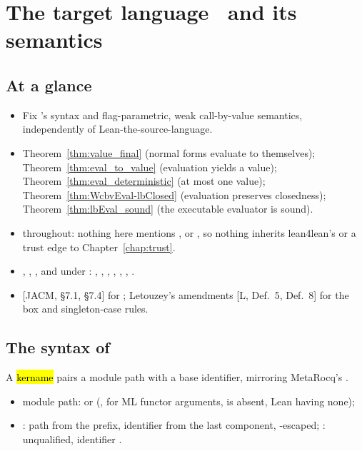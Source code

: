 \chapter{\texorpdfstring{The target language \lbox\ and its semantics}{The target language lambda-box and its semantics}}
\label{chap:lambdabox}

\section*{At a glance}
\begin{itemize}
\item {} Fix \lbox{}'s syntax and flag-parametric, weak call-by-value semantics, independently of Lean-the-source-language.
\item {} Theorem~\ref{thm:value_final} (normal forms evaluate to themselves); Theorem~\ref{thm:eval_to_value} (evaluation yields a value); Theorem~\ref{thm:eval_deterministic} (at most one value); Theorem~\ref{thm:WcbvEval-lbClosed} (evaluation preserves closedness); Theorem~\ref{thm:lbEval_sound} (the executable evaluator is sound).
\item {} \stProved{} throughout: nothing here mentions , \TrExprS{} or , so nothing inherits lean4lean's  or a trust edge to Chapter~\ref{chap:trust}.
\item {} , , , and under : , , , , , , .
\item {} [JACM, \S7.1, \S7.4] for \WcbvEval{}; Letouzey's amendments [L, Def.~5, Def.~8] for the box and singleton-case rules.
\end{itemize}

\section{\texorpdfstring{The syntax of \lbox}{The syntax of lambda-box}}
\label{sec:lambdabox:syntax}

\begin{definition}
\label{def:Kername}
\leanok
{} A \lbox{} \hl{kername} pairs a module path with a base identifier, mirroring MetaRocq's .
\begin{itemize}
\item module path:  or  (, for ML functor arguments, is absent, Lean having none);
\item {}: path from the prefix, identifier from the last component, -escaped; : unqualified, identifier .
\end{itemize}
\end{definition}


